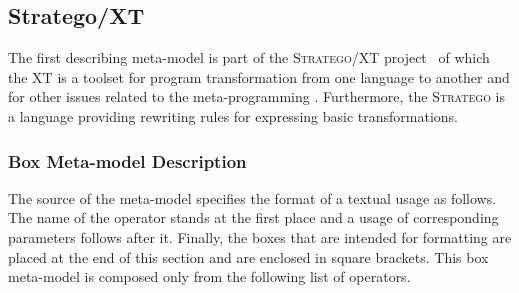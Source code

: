 \documentclass[12pt,notitlepage,a4paper]{report}
\begin{document}
\subsection {Stratego/XT}

The first describing meta-model is part of the \textsc{Stratego/XT} project~\cite{StrategoXT} of which the XT is a toolset for program transformation from one language to another and for other issues related to the meta-programming \cite{Metaprogramming}. Furthermore, the \textsc{Stratego} is a language providing rewriting rules for expressing basic transformations.

\subsubsection{Box Meta-model Description}

The source of the meta-model specifies the format of a textual usage as follows. The name of the operator stands at the first place and a usage of corresponding parameters follows after it. Finally, the boxes that are intended for formatting are placed at the end of this section and are enclosed in square brackets. This box meta-model is composed only from the following list of operators.
\end{document}
